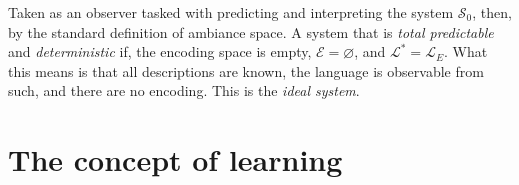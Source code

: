 Taken as an observer tasked with predicting and interpreting the system $\mathcal{S}_{0}$, then, by the standard definition of ambiance space. A system that is \textit{total predictable} and \textit{deterministic} if, the encoding space is empty, $\mathcal{E}=\varnothing$, and $\mathcal{L}^{*}=\mathcal{L}_{E}$. What this means is that all descriptions are known, the language is observable from such, and there are no encoding. This is the \textit{ideal system}. 

\section{The concept of learning}


